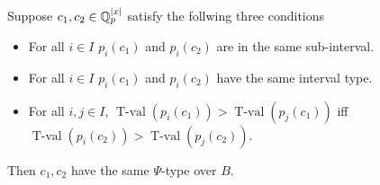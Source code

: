 \documentclass{amsart}
\DeclareMathOperator{\tval}{T-val}
\begin{document}
\begin{Lemma}
  Suppose $c_1, c_2 \in \mathbb{Q}_p^{|x|}$ satisfy the follwing three conditions 
  \begin{itemize}
  \item For all $i \in I$ $p_i(c_1)$ and $p_i(c_2)$ are in the same sub-interval.
  \item For all $i \in I$ $p_i(c_1)$ and $p_i(c_2)$ have the same interval type.
  \item For all $i,j \in I$, $\tval(p_i(c_1)) > \tval(p_j(c_1))$ iff $\tval(p_i(c_2)) > \tval(p_j(c_2))$.
  \end{itemize}
  Then $c_1, c_2$ have the same $\Psi$-type over $B$.
\end{Lemma}
\end{document}
